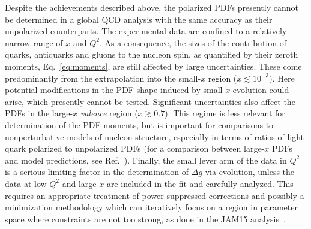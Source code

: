 Despite the achievements described above, the polarized PDFs presently cannot 
be determined in a global QCD analysis with the same accuracy as their 
unpolarized counterparts.
%
The experimental data are confined to a relatively narrow range of 
$x$ and $Q^2$.
%
As a consequence, the sizes of the contribution of quarks, antiquarks and 
gluons to the nucleon spin, as quantified by their zeroth moments, 
Eq.~\eqref{eq:moments}, are still affected by large uncertainties. 
%
These come predominantly from the extrapolation into the small-$x$ region 
($x\lesssim 10^{-3}$). 
%
Here potential modifications in the PDF shape induced by small-$x$ evolution 
could arise, which presently cannot be tested.
%
Significant uncertainties also affect the PDFs in the large-$x$ 
{\it valence} region ($x\gtrsim 0.7$). 
%
This regime is less relevant for determination of the PDF moments, but is 
important for comparisons to nonperturbative models of nucleon structure, 
especially in terms of ratios of light-quark polarized to unpolarized PDFs 
(for a comparison between large-$x$ PDFs 
and model predictions, see Ref.~\cite{Nocera:2014uea}).
%
Finally, the small lever arm of the data in $Q^2$ is a serious limiting factor 
in the determination of $\Delta g$ via evolution, unless the data at low $Q^2$
and large $x$ are included in the fit and carefully analyzed.
%
This requires an appropriate treatment of power-suppressed corrections and 
possibly a minimization methodology which can iteratively focus on a region 
in parameter space where constraints are not too strong, as done in the 
JAM15 analysis~\cite{Sato:2016tuz}. 

